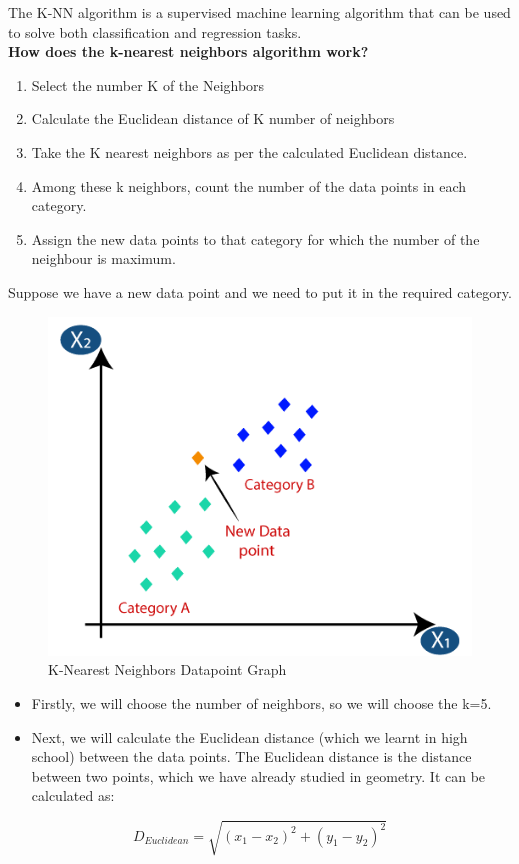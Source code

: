     The K-NN algorithm is a supervised machine learning algorithm that can be used to solve both classification and regression tasks. \\

\textbf{How does the k-nearest neighbors algorithm work?} \\

\begin{enumerate}
\item Select the number K of the Neighbors
\item Calculate the Euclidean distance of K number of neighbors
\item Take the K nearest neighbors as per the calculated Euclidean distance.
\item Among these k neighbors, count the number of the data points in each category.
\item Assign the new data points to that category for which the number of the neighbour is maximum.
\end{enumerate}

Suppose we have a new data point and we need to put it in the required category.
\begin{figure}[H]
        \includegraphics[width=\linewidth]{images/knnexp2.png}
        \caption{K-Nearest Neighbors Datapoint Graph}
        \label{fig:knndp}
\end{figure}
 
\begin{itemize}
\item Firstly, we will choose the number of neighbors, so we will choose the k=5.
\item Next, we will calculate the Euclidean distance (which we learnt in high school) between the data points. The Euclidean distance is the distance between two points, which we have already studied in geometry. It can be calculated as:
\end{itemize}
\begin{equation}
    {D_{Euclidean}} = \sqrt{(x_1-x_2)^2 + (y_1-y_2)^2}
\end{equation}

